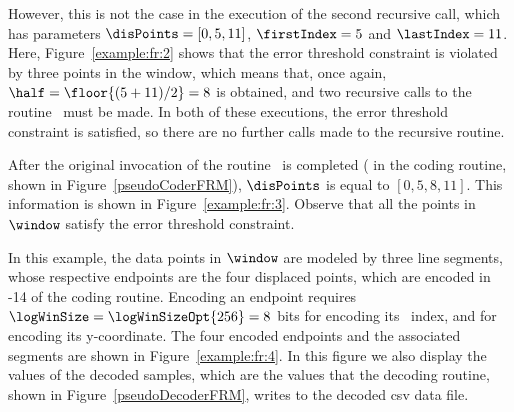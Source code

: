 \clearpage




However, this is not the case in the execution of the second recursive call, which has parameters $\disPoints=[0, 5, 11]$, $\firstIndex = 5$ and $\lastIndex = 11$. Here, Figure~\ref{example:fr:2} shows that the error threshold constraint is violated by three points in the window, which means that, once again, $\half=\floor{(5 + 11) / 2}=8$ is obtained, and two recursive calls to the routine \getDisplacedPointsMethod\ must be made. In both of these executions, the error threshold constraint is satisfied, so there are no further calls made to the recursive routine. 


After the original invocation of the routine \getDisplacedPointsMethod\ is completed ( in the coding routine, shown in Figure~\ref{pseudoCoderFRM}), $\disPoints$ is equal to $[0, 5, 8, 11]$. This information is shown in Figure~\ref{example:fr:3}. Observe that all the points in $\window$ satisfy the error threshold constraint.




In this example, the data points in $\window$ are modeled by three line segments, whose respective endpoints are the four displaced points, which are encoded in -14 of the coding routine. Encoding an endpoint requires $\logWinSize = \logWinSizeOpt{256}=8$ bits for encoding its \window\ index, and \tobitexp for encoding its y-coordinate. The four encoded endpoints and the associated segments are shown in Figure~\ref{example:fr:4}. In this figure we also display the values of the decoded samples, which are the values that the decoding routine, shown in Figure~\ref{pseudoDecoderFRM}, writes to the decoded csv data file. 




\clearpage

